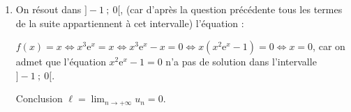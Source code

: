 \documentclass[10pt]{article}
\providecommand{\e}{{\mathrm{e}}}
\begin{document}
\begin{enumerate}
\begin{enumerate}
La question précédente montre que :
		
$\bullet~~$la suite $\left(u_n\right)$ est croissante ;

$\bullet~~$la suite $\left(u_n\right)$ est majorée par $0$ ;

La suite $\left(u_n\right)$ est donc convergente vers une limite $\ell$, avec $\ell \leqslant 0$.
		\item 




On résout dans $]- 1~;~0[$, (car d'après la question précédente tous les termes de la suite appartiennent à cet intervalle) l'équation  :

$f(x) = x \iff x^3\e^x = x \iff x^3\e^x - x = 0 \iff x\left(x^2\e^x - 1 \right) = 0 \iff x = 0$, car on admet que l'équation $x^2\e^x - 1 = 0$ n'a pas de solution dans l'intervalle $]- 1~;~0[$.

Conclusion $\ell = \displaystyle\lim_{n \to + \infty} u_n = 0$.
	\end{enumerate}
\end{enumerate}

\bigskip
\end{document}
